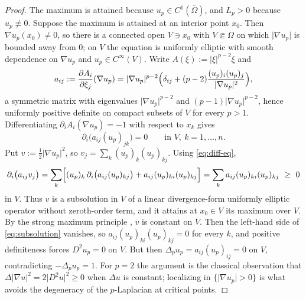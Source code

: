 \documentclass[11pt]{article}
\newcommand{\abs}[1]{\lvert #1\rvert}
\theoremstyle{definition}
\theoremstyle{remark}
\begin{document}
\begin{proof}
The maximum is attained because $u_p\in C^{1}(\overline\Omega)$, and $L_p>0$
because $u_p\not\equiv0$. Suppose the maximum is attained at an interior
point $x_0$.
Then $\nabla u_p(x_0)\ne0$, so there is a connected open $V\ni x_0$ with
$V\Subset\Omega$ on which $\abs{\nabla u_p}$ is bounded away from $0$; on $V$
the equation is uniformly elliptic with smooth dependence on $\nabla u_p$ and
$u_p\in C^\infty(V)$. Write $A(\xi):=\abs{\xi}^{p-2}\xi$ and
\[
a_{ij}:=\frac{\partial A_i}{\partial\xi_j}(\nabla u_p)
=\abs{\nabla u_p}^{p-2}
\Bigl(\delta_{ij}+(p-2)\frac{(u_p)_i(u_p)_j}{\abs{\nabla u_p}^{2}}\Bigr),
\]
a symmetric matrix with eigenvalues $\abs{\nabla u_p}^{p-2}$ and
$(p-1)\abs{\nabla u_p}^{p-2}$, hence uniformly positive definite on compact
subsets of $V$ for every $p>1$. Differentiating
$\partial_iA_i(\nabla u_p)=-1$ with respect to $x_k$ gives
\begin{equation}\label{eq:diff-eq}
\partial_i\bigl(a_{ij}(u_p)_{jk}\bigr)=0
\qquad\text{in }V,\ k=1,\dots,n.
\end{equation}
Put $v:=\tfrac12\abs{\nabla u_p}^2$, so $v_j=\sum_k(u_p)_k(u_p)_{kj}$. Using
\eqref{eq:diff-eq},
\begin{equation}\label{eq:subsolution}
\partial_i\bigl(a_{ij}v_j\bigr)
=\sum_k\Bigl[(u_p)_k\,\partial_i\bigl(a_{ij}(u_p)_{kj}\bigr)
+a_{ij}(u_p)_{ki}(u_p)_{kj}\Bigr]
=\sum_ka_{ij}(u_p)_{ki}(u_p)_{kj}\ \ge\ 0
\end{equation}
in $V$. Thus $v$ is a subsolution in $V$ of a linear divergence-form uniformly
elliptic operator without zeroth-order term, and it attains at $x_0\in V$ its
maximum over $V$. By the strong maximum principle \cite[Theorem~8.19]{GT},
$v$ is constant on $V$. Then the left-hand side of \eqref{eq:subsolution}
vanishes, so $a_{ij}(u_p)_{ki}(u_p)_{kj}=0$ for every $k$, and positive
definiteness forces $D^2u_p=0$ on $V$. But then
$\Delta_pu_p=a_{ij}(u_p)_{ij}=0$ on $V$, contradicting $-\Delta_pu_p=1$.
For $p=2$ the argument is the classical observation that
$\Delta\abs{\nabla u}^2=2\abs{D^2u}^2\ge0$ when $\Delta u$ is constant;
localizing in $\{\abs{\nabla u_p}>0\}$ is what avoids the degeneracy of the
$p$-Laplacian at critical points.
\end{proof}
\end{document}
